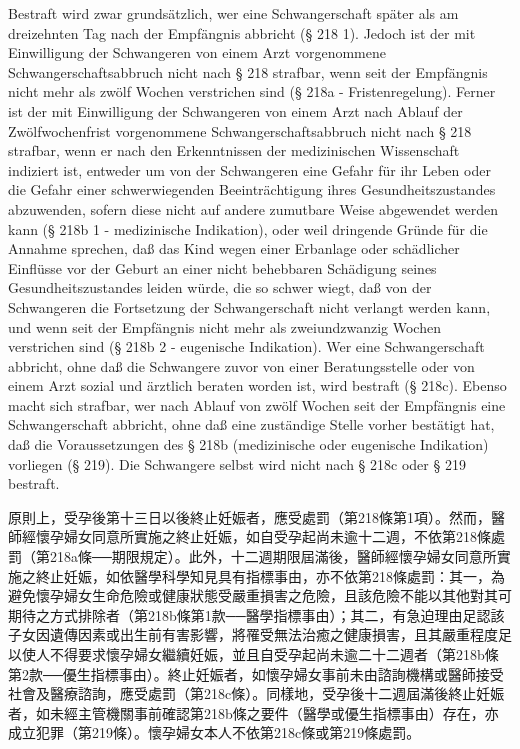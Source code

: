 \documentclass[12pt]{article}
\begin{document}
\syncleft
\begin{sourcepara}
Bestraft wird zwar grundsätzlich, wer eine Schwangerschaft später als am dreizehnten Tag nach der Empfängnis abbricht (§ 218 \abbrAbs{} 1). Jedoch ist der mit Einwilligung der Schwangeren von einem Arzt vorgenommene Schwangerschaftsabbruch nicht nach § 218 strafbar, wenn seit der Empfängnis nicht mehr als zwölf Wochen verstrichen sind (§ 218a - Fristenregelung). Ferner ist der mit Einwilligung der Schwangeren von einem Arzt nach Ablauf der Zwölfwochenfrist vorgenommene Schwangerschaftsabbruch nicht nach § 218 strafbar, wenn er nach den Erkenntnissen der medizinischen Wissenschaft indiziert ist, entweder um von der Schwangeren eine Gefahr für ihr Leben oder die Gefahr einer schwerwiegenden Beeinträchtigung ihres Gesundheitszustandes abzuwenden, sofern diese nicht auf andere zumutbare Weise abgewendet werden kann (§ 218b \abbrNr{}1 - medizinische Indikation), oder weil dringende Gründe für die Annahme sprechen, daß das Kind wegen einer Erbanlage oder schädlicher Einflüsse vor der Geburt an einer nicht behebbaren Schädigung seines Gesundheitszustandes leiden würde, die so schwer wiegt, daß von der Schwangeren die Fortsetzung der Schwangerschaft nicht verlangt werden kann, und wenn seit der Empfängnis nicht mehr als zweiundzwanzig Wochen verstrichen sind (§ 218b \abbrNr{} 2 - eugenische Indikation). Wer eine Schwangerschaft abbricht, ohne daß die Schwangere zuvor von einer Beratungsstelle oder von einem Arzt sozial und ärztlich beraten worden ist, wird bestraft (§ 218c). Ebenso macht sich strafbar, wer nach Ablauf von zwölf Wochen seit der Empfängnis eine Schwangerschaft abbricht, ohne daß eine zuständige Stelle vorher bestätigt hat, daß die Voraussetzungen des § 218b (medizinische oder eugenische Indikation) vorliegen (§ 219). Die Schwangere selbst wird nicht nach § 218c oder § 219 bestraft.
\end{sourcepara}
\begin{transpara}
原則上，受孕後第十三日以後終止妊娠者，應受處罰（第218條第1項）。然而，醫師經懷孕婦女同意所實施之終止妊娠，如自受孕起尚未逾十二週，不依第218條處罰（第218a條──期限規定）。此外，十二週期限屆滿後，醫師經懷孕婦女同意所實施之終止妊娠，如依醫學科學知見具有指標事由，亦不依第218條處罰：其一，為避免懷孕婦女生命危險或健康狀態受嚴重損害之危險，且該危險不能以其他對其可期待之方式排除者（第218b條第1款──醫學指標事由）；其二，有急迫理由足認該子女因遺傳因素或出生前有害影響，將罹受無法治癒之健康損害，且其嚴重程度足以使人不得要求懷孕婦女繼續妊娠，並且自受孕起尚未逾二十二週者（第218b條第2款──優生指標事由）。終止妊娠者，如懷孕婦女事前未由諮詢機構或醫師接受社會及醫療諮詢，應受處罰（第218c條）。同樣地，受孕後十二週屆滿後終止妊娠者，如未經主管機關事前確認第218b條之要件（醫學或優生指標事由）存在，亦成立犯罪（第219條）。懷孕婦女本人不依第218c條或第219條處罰。
\end{transpara}
\end{document}

